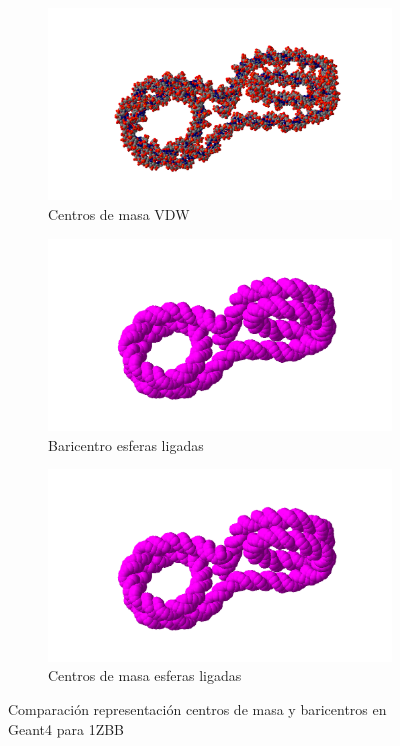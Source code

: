 \begin{figure}
\begin{subfigure}{.5\textwidth}
  \centering
  \includegraphics[width=.78\linewidth]{./Figures/bavdw.png}
  \caption{Centros de masa VDW}
  \label{fig:sub44}
\end{subfigure}
\begin{subfigure}{.5\textwidth}
  \centering
  \includegraphics[width=.78\linewidth]{./Figures/a.png}
  \caption{Baricentro esferas ligadas}
  \label{fig:sub55}
\end{subfigure}%
\begin{subfigure}{.5\textwidth}
  \centering
  \includegraphics[width=.78\linewidth]{./Figures/a.png}
  \caption{Centros de masa esferas ligadas}
  \label{fig:sub66}
\end{subfigure}
\caption[Comparación de centros de masa y baricentros en Geant4 1ZBB]{Comparación representación centros de masa y baricentros en Geant4 para 1ZBB}
\label{h}
\end{figure}




